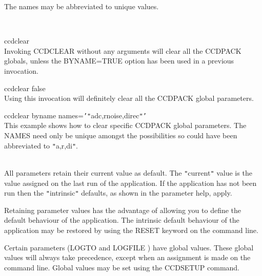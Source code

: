 \documentclass[twoside,11pt]{article}
\newcommand{\htmlref}[2]{#1}
\renewcommand{\_}{\texttt{\symbol{95}}}
\newcommand{\qt}[1]{{\tt "}#1{\tt "}}
\newcommand{\qs}[1]{{\tt '}#1{\tt '}}
\newcommand{\routine}[1]{{\sc #1}}
\newcommand{\xroutine}[1]{\htmlref{{\sc #1}}{#1}}
\newcommand{\sstexamples}[1]{
   \item[Examples:] \mbox{} \\
   \vspace{-3.5ex}
   \begin{description}
      #1
   \end{description}
}
\newcommand{\sstexamplesubsection}[2]{\sloppy \item{\ssttt #1} \mbox{} \\ #2 }
\newcommand{\sstdiytopic}[2]{\item[#1:] \mbox{} \\[1.3ex] #2}
\newcommand{\sstexamples}[1]{
      \item[Examples:] \\
      \begin{description}
         #1
      \end{description}
      \\
   }
\newcommand{\sstexamplesubsection}[2]{\item[{\ssttt #1}] #2}
\newcommand{\sstdiytopic}[2]{\item[{#1}] #2 }
\begin{document}
{{{         The names may be abbreviated to unique values.
      }
   }
   \sstexamples{
      \sstexamplesubsection{
         ccdclear
      } {
         Invoking \routine{CCDCLEAR} without any arguments will clear all the
         CCDPACK globals, unless the BYNAME=TRUE option has been used in
         a previous invocation.
      }
      \sstexamplesubsection{
         ccdclear false
      } {
         Using this invocation will definitely clear all the CCDPACK
         global parameters.
      }
      \sstexamplesubsection{
         ccdclear byname names=\qs{\qt{adc,rnoise,direc}}
      } {
         This example shows how to clear specific CCDPACK global
         parameters. The NAMES need only be unique amongst the
         possibilities so could have been abbreviated to \qt{a,r,di}.
      }
   }
   \sstdiytopic{
      Behaviour of parameters
   } {
      All parameters retain their current value as default. The
      \qt{current} value is the value assigned on the last run of the
      application. If the application has not been run then the
      \qt{intrinsic} defaults, as shown in the parameter help, apply.

      Retaining parameter values has the advantage of allowing you to
      define the default behaviour of the application. The intrinsic
      default behaviour of the application may be restored by using the
      RESET keyword on the command line.

      Certain parameters (LOGTO and LOGFILE ) have global values. These
      global values will always take precedence, except when an
      assignment is made on the command line.  Global values may be set
      using the \xroutine{CCDSETUP} command.
   }
}
\end{document}

